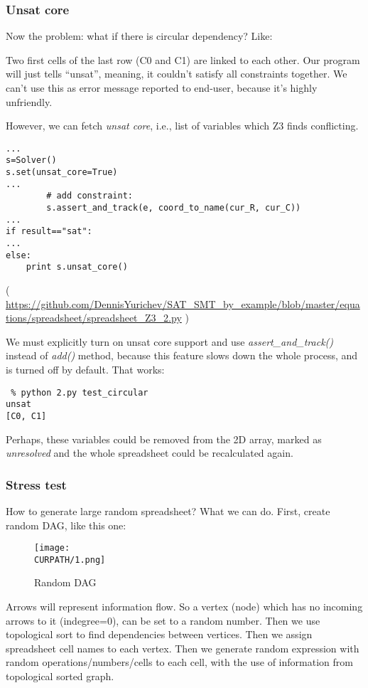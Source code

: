 \subsubsection{Unsat core}

Now the problem: what if there is circular dependency? Like:



Two first cells of the last row (C0 and C1) are linked to each other.
Our program will just tells ``unsat'', meaning, it couldn't satisfy all constraints together.
We can't use this as error message reported to end-user, because it's highly unfriendly.

However, we can fetch \textit{unsat core}, i.e., list of variables which Z3 finds conflicting.

\begin{lstlisting}
...
s=Solver()
s.set(unsat_core=True)
...
        # add constraint:
        s.assert_and_track(e, coord_to_name(cur_R, cur_C))
...
if result=="sat":
...
else:
    print s.unsat_core()
\end{lstlisting}

( \url{https://github.com/DennisYurichev/SAT_SMT_by_example/blob/master/equations/spreadsheet/spreadsheet_Z3_2.py} )

We must explicitly turn on unsat core support and use \textit{assert\_and\_track()} instead of \textit{add()} method,
because this feature slows down the whole process, and is turned off by default.
That works:

\begin{lstlisting}
 % python 2.py test_circular
unsat
[C0, C1]
\end{lstlisting}

Perhaps, these variables could be removed from the 2D array, marked as \textit{unresolved}
and the whole spreadsheet could be recalculated again.

\subsubsection{Stress test}

How to generate large random spreadsheet?
What we can do.
First, create random \ac{DAG}, like this one:

\begin{figure}[H]
\centering
\texttt{[image: \\CURPATH/1.png]}
\caption{Random \ac{DAG}}
\end{figure}

Arrows will represent information flow.
So a vertex (node) which has no incoming arrows to it (indegree=0), can be set to a random number.
Then we use topological sort to find dependencies between vertices.
Then we assign spreadsheet cell names to each vertex.
Then we generate random expression with random operations/numbers/cells to each cell,
with the use of information from topological sorted graph.

